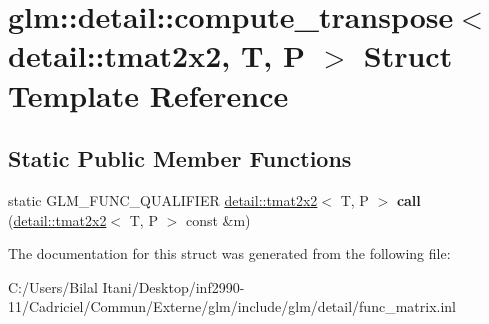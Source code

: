 \hypertarget{structglm_1_1detail_1_1compute__transpose_3_01detail_1_1tmat2x2_00_01_t_00_01_p_01_4}{}\section{glm\+:\+:detail\+:\+:compute\+\_\+transpose$<$ detail\+:\+:tmat2x2, T, P $>$ Struct Template Reference}
\label{structglm_1_1detail_1_1compute__transpose_3_01detail_1_1tmat2x2_00_01_t_00_01_p_01_4}
\subsection*{Static Public Member Functions}
\begin{DoxyCompactItemize}
\item 
static G\+L\+M\+\_\+\+F\+U\+N\+C\+\_\+\+Q\+U\+A\+L\+I\+F\+I\+ER \hyperlink{structglm_1_1detail_1_1tmat2x2}{detail\+::tmat2x2}$<$ T, P $>$ {\bfseries call} (\hyperlink{structglm_1_1detail_1_1tmat2x2}{detail\+::tmat2x2}$<$ T, P $>$ const \&m)\hypertarget{structglm_1_1detail_1_1compute__transpose_3_01detail_1_1tmat2x2_00_01_t_00_01_p_01_4_a213c7106f07140855ec81d916ae5f629}{}\label{structglm_1_1detail_1_1compute__transpose_3_01detail_1_1tmat2x2_00_01_t_00_01_p_01_4_a213c7106f07140855ec81d916ae5f629}

\end{DoxyCompactItemize}


The documentation for this struct was generated from the following file\+:\begin{DoxyCompactItemize}
\item 
C\+:/\+Users/\+Bilal Itani/\+Desktop/inf2990-\/11/\+Cadriciel/\+Commun/\+Externe/glm/include/glm/detail/func\+\_\+matrix.\+inl\end{DoxyCompactItemize}
